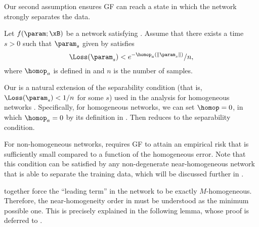 Our second assumption ensures GF can reach a state in which the network strongly separates the data.
\begin{assumption}
\label{asp:initial-cond-gf}
Let $f(\param;\xB)$ be a network satisfying .
Assume that there exists a time $s>0$ such that $\param_s$ given by  satisfies 
\begin{equation}
\label{eq: initial-cond-gf}
    \Loss(\param_s) < 
        e^{-\homop_a(\|\param_s\|)}/n,
\end{equation}
where $\homop_a$ is defined in  and $n$ is the number of samples.
\end{assumption}

Our  is a natural extension of the separability condition (that is, \(\Loss(\param_s) < 1/n\) for some $s$) used in the analysis for homogeneous networks \citep{lyu2020gradient,ji2020directional}. Specifically, for homogeneous networks, we can set $\homop=0$, in which $\homop_a=0$ by its definition in . Then  reduces to the separability condition.%

For non-homogeneous networks,  requires GF to attain an empirical risk that is sufficiently small compared to a function of the homogeneous error. Note that this condition can be satisfied by any non-degenerate near-homogeneous network that is able to separate the training data, which will be discussed further in .

 together force the ``leading term'' in the network to be exactly $M$-homogeneous. Therefore, the near-homogeneity order in  must be understood as the minimum possible one. 
This is precisely explained in the following lemma, whose proof is deferred to .

